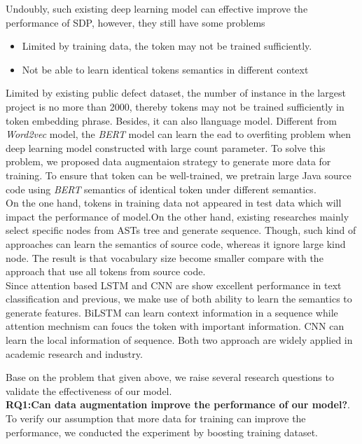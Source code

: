 Undoubly, such existing deep learning model can effective improve the performance of SDP, however, they still have some problems 
\begin{itemize}
    \item Limited by training data, the token may not be trained sufficiently.
    \item Not be able to learn identical tokens semantics in different context
\end{itemize}

Limited by existing public defect dataset, the number of instance in the largest project is no more than 2000, thereby tokens may not be trained sufficiently in token embedding phrase. Besides, it can also llanguage model. Different from \textit{Word2vec} model, the \textit{BERT} model can learn the ead to overfiting problem when deep learning model constructed with large count parameter. To solve this problem, we proposed data augmentaion strategy to generate more data for training. To ensure that token can be well-trained, we pretrain large Java source code using  \textit{BERT} semantics of identical token under different semantics. \\

On the one hand, tokens in training data not appeared in test data which will impact the performance of model.On the other hand, existing researches mainly select specific nodes from ASTs tree and generate sequence. Though, such kind of approaches can learn the semantics of source code, whereas it ignore large kind node. The result is that vocabulary size become smaller compare with the approach that use all tokens from source code. \\ 

Since attention based LSTM and CNN are show excellent performance in text classification and previous, we make use of both ability to learn the semantics to generate features. BiLSTM can learn context information in a sequence while attention mechnism can foucs the token with important information. CNN can learn the local information of sequence. Both two approach are widely applied in academic research and industry.

Base on the problem that given above, we raise several research questions to validate the effectiveness of our model.\\

\textbf{RQ1:Can data augmentation improve the performance of our model?}. To verify our assumption that more data for training can improve the performance, we conducted the experiment by boosting training dataset. 

